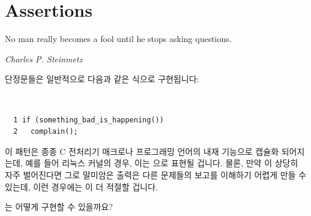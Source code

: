 \section{Assertions}
\label{sec:debugging:Assertions}
%
\epigraph{No man really becomes a fool until he stops asking questions.}
	 {\emph{Charles P. Steinmetz}}

단정문들은 일반적으로 다음과 같은 식으로 구현됩니다:

\vspace{5pt}
\begin{minipage}[t]{\columnwidth}
\tt
\scriptsize
\begin{verbatim}
  1 if (something_bad_is_happening())
  2   complain();
\end{verbatim}
\end{minipage}
\vspace{5pt}

이 패턴은 종종 C 전처리기 매크로나 프로그래밍 언어의 내재 기능으로 캡슐화
되어지는데, 예를 들어 리눅스 커널의 경우, 이는
 으로 표현될 겁니다.
물론, 만약  이 상당히 자주 벌어진다면 그로
말미암은 출력은 다른 문제들의 보고를 이해하기 어렵게 만들 수 있는데, 이런
경우에는  이 더 적절할 겁니다.

\QuickQuiz{}
	 는 어떻게 구현할 수 있을까요?
	\iffalse


